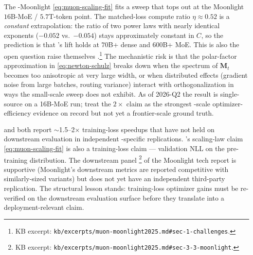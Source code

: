 \begin{contradiction}
\label{contra:muon-frontier-scale}
The -Moonlight  \eqref{eq:muon-scaling-fit} fits a
sweep that tops out at the Moonlight $16$B-MoE / $5.7$T-token point.
The matched-loss compute ratio $\eta \approx 0.52$ is a
\emph{constant} extrapolation: the ratio of two power laws with
nearly identical exponents ($-0.052$ vs.\ $-0.054$) stays
approximately constant in $C$, so the prediction is that 's lift
holds at $70$B+ dense and $600$B+ MoE. This is also the open
question \citet{muon-moonlight2025} raise themselves \citep[\S
1]{muon-moonlight2025}.\protect\footnote{KB excerpt:
\nolinkurl{kb/excerpts/muon-moonlight2025.md#sec-1-challenges}.} The
mechanistic risk is that the polar-factor approximation in
\cref{eq:newton-schulz} breaks down when the spectrum of
$\mathbf{M}_t$ becomes too anisotropic at very large width, or when
distributed effects (gradient noise from large batches,  routing
variance) interact with orthogonalization in ways the small-scale
sweep does not exhibit. As of 2026-Q2 the result is single-source
on a 16B-MoE run; treat the $2\times$ claim as the strongest
-scale optimizer-efficiency evidence on record but not yet a
frontier-scale ground truth.
\end{contradiction}

\begin{contradiction}
\label{contra:training-loss-vs-downstream}
 \citep[Chen et al.\ 2023]{muon-moonlight2025} and 
\citep[Liu, Li et al.\ 2023]{muon-moonlight2025} both report
$\sim$1.5--2$\times$ training-loss speedups that have not held on
downstream evaluation in independent
-specific replications. 's scaling-law claim
\eqref{eq:muon-scaling-fit} is also a training-loss claim ---
validation NLL on the pre-training distribution. The downstream
panel \citep[\S 3]{muon-moonlight2025}\protect\footnote{KB excerpt:
\nolinkurl{kb/excerpts/muon-moonlight2025.md#sec-3-3-moonlight}.} of
the Moonlight tech report is supportive (Moonlight's downstream
metrics are reported competitive with similarly-sized 
variants) but does not yet have an independent third-party
replication. The structural lesson stands: training-loss optimizer
gains must be re-verified on the downstream evaluation surface
before they translate into a deployment-relevant claim.
\end{contradiction}

